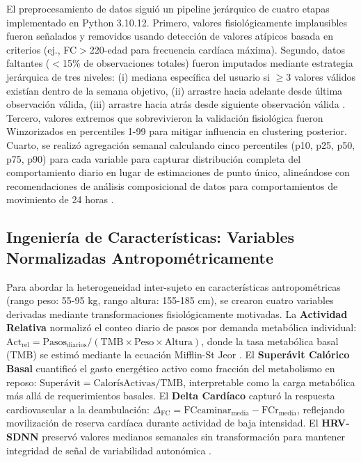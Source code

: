 El preprocesamiento de datos siguió un pipeline jerárquico de cuatro etapas implementado en Python 3.10.12. Primero, valores fisiológicamente implausibles fueron señalados y removidos usando detección de valores atípicos basada en criterios (ej., FC$>$220-edad para frecuencia cardíaca máxima). Segundo, datos faltantes ($<$15\% de observaciones totales) fueron imputados mediante estrategia jerárquica de tres niveles: (i) mediana específica del usuario si $\geq$3 valores válidos existían dentro de la semana objetivo, (ii) arrastre hacia adelante desde última observación válida, (iii) arrastre hacia atrás desde siguiente observación válida \cite{Little1988,Azur2011}. Tercero, valores extremos que sobrevivieron la validación fisiológica fueron Winzorizados en percentiles 1-99 para mitigar influencia en clustering posterior. Cuarto, se realizó agregación semanal calculando cinco percentiles (p10, p25, p50, p75, p90) para cada variable para capturar distribución completa del comportamiento diario en lugar de estimaciones de punto único, alineándose con recomendaciones de análisis composicional de datos para comportamientos de movimiento de 24 horas \cite{Chastin2015,Dumuid2018}.

\subsection{Ingeniería de Características: Variables Normalizadas Antropométricamente}
\label{subsec:caracteristicas}

Para abordar la heterogeneidad inter-sujeto en características antropométricas (rango peso: 55-95 kg, rango altura: 155-185 cm), se crearon cuatro variables derivadas mediante transformaciones fisiológicamente motivadas. La \textbf{Actividad Relativa} normalizó el conteo diario de pasos por demanda metabólica individual: $\text{Act}_{\text{rel}} = \text{Pasos}_{\text{diarios}} / (\text{TMB} \times \text{Peso} \times \text{Altura})$, donde la tasa metabólica basal (TMB) se estimó mediante la ecuación Mifflin-St Jeor \cite{Mifflin1990}. El \textbf{Superávit Calórico Basal} cuantificó el gasto energético activo como fracción del metabolismo en reposo: $\text{Superávit} = \text{CalorísActivas} / \text{TMB}$, interpretable como la carga metabólica más allá de requerimientos basales. El \textbf{Delta Cardíaco} capturó la respuesta cardiovascular a la deambulación: $\Delta_{\text{FC}} = \text{FCcaminar}_{\text{media}} - \text{FCr}_{\text{media}}$, reflejando movilización de reserva cardíaca durante actividad de baja intensidad. El \textbf{HRV-SDNN} preservó valores medianos semanales sin transformación para mantener integridad de señal de variabilidad autonómica \cite{Shaffer2017}.


